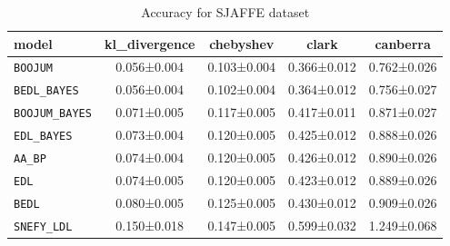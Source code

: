 \begin{table}[h]
\centering
\caption{Accuracy for SJAFFE dataset}
\label{tab:sjaffe_accuracy}

\begin{tabular}{lcccc}
\toprule
\textbf{model} & \textbf{kl\_divergence} & \textbf{chebyshev} & \textbf{clark} & \textbf{canberra} \\
\midrule
\texttt{BOOJUM} & 0.056±0.004 & 0.103±0.004 & 0.366±0.012 & 0.762±0.026 \\
\texttt{BEDL\_BAYES} & 0.056±0.004 & 0.102±0.004 & 0.364±0.012 & 0.756±0.027 \\
\texttt{BOOJUM\_BAYES} & 0.071±0.005 & 0.117±0.005 & 0.417±0.011 & 0.871±0.027 \\
\texttt{EDL\_BAYES} & 0.073±0.004 & 0.120±0.005 & 0.425±0.012 & 0.888±0.026 \\
\texttt{AA\_BP} & 0.074±0.004 & 0.120±0.005 & 0.426±0.012 & 0.890±0.026 \\
\texttt{EDL} & 0.074±0.005 & 0.120±0.005 & 0.423±0.012 & 0.889±0.026 \\
\texttt{BEDL} & 0.080±0.005 & 0.125±0.005 & 0.430±0.012 & 0.909±0.026 \\
\texttt{SNEFY\_LDL} & 0.150±0.018 & 0.147±0.005 & 0.599±0.032 & 1.249±0.068 \\
\bottomrule
\end{tabular}

\end{table}